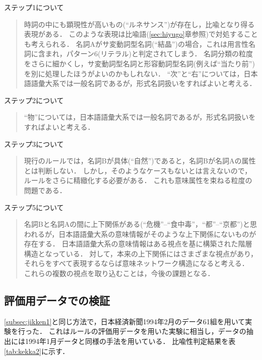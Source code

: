 \medskip
ステップ1について
\begin{quote}
時詞の中にも顕現性が高いもの(``ルネサンス'')が存在し，比喩となり得る表現がある．
このような表現は比喩語(\ref{sec:hiyugo}章参照)で対処することも考えられる．
名詞Aがサ変動詞型名詞(``結晶'')の場合，これは用言性名詞に含まれ，パターン6(リテラル)と判定されてしまう．
名詞分類の粒度をさらに細かくし，サ変動詞型名詞と形容動詞型名詞(例えば``当たり前'')を別に処理したほうがよいのかもしれない．
``次''と``右''については，日本語語彙大系では一般名詞であるが，形式名詞扱いをすればよいと考える．
\end{quote}

\medskip
ステップ2について
\begin{quote}
``物''については，日本語語彙大系では一般名詞であるが，形式名詞扱いをすればよいと考える．
\end{quote}

\medskip
ステップ3について
\begin{quote}
現行のルールでは，名詞Bが具体(``自然'')であると，名詞Bが名詞Aの属性とは判断しない．
しかし，そのようなケースもないとは言えないので，ルールをさらに精緻化する必要がある．
これも意味属性を束ねる粒度の問題である．
\end{quote}

\medskip
ステップ5について
\begin{quote}
名詞Bと名詞Aの間に上下関係がある(``危機''--``食中毒''，``都''--``京都'')と思われるが，日本語語彙大系の意味情報がそのような上下関係にないものが存在する．
日本語語彙大系の意味情報はある視点を基に構築された階層構造となっている．
対して，本来の上下関係にはさまざまな視点があり，それらをすべて表現するならば意味ネットワーク構造になると考える．
これらの複数の視点を取り込むことは，今後の課題となる．
\end{quote}

\subsection{評価用データでの検証}

\ref{subsec:jikken1}と同じ方法で，日本経済新聞1994年2月のデータ61組を用いて実験を行った．
これはルールの評価用データを用いた実験に相当し，データの抽出には1994年1月データと同様の手法を用いている．
比喩性判定結果を表\ref{tab:kekka2}に示す．

